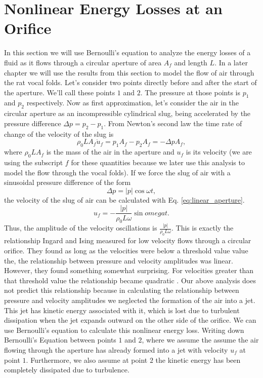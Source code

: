 \documentclass[12pt, letter]{report}
\begin{document}
\section{Nonlinear Energy Losses at an Orifice}
In this section we will use Bernoulli's equation to analyze the energy losses of a fluid as it flows through a circular aperture of area $A_f$ and length $L$. In a later chapter we will use the results from this section to model the flow of air through the rat vocal folds. Let's consider two points directly before and after the start of the aperture. We'll call these points $1$ and $2$. The pressure at those points is $p_1$ and $p_2$ respectively. Now as first approximation, let's consider the air in the circular aperture as an incompressible cylindrical slug, being accelerated by the pressure difference $\Delta p = p_2 - p_1$. From Newton's second law the time rate of change of the velocity of the slug is 
\begin{equation}  
\label{eq:linear_aperture}
\rho_0 L A_f \dot{u}_f = p_1 A_f - p_2 A_f = -\Delta p A_f,
\end{equation}
where $\rho_0 L A_f$ is the mass of the air in the aperture and $u_f$ is its velocity (we are using the subscript $f$ for these quantities because we later use this analysis to model the flow through the vocal folds). If we force the slug of air with a sinusoidal pressure difference of the form
\begin{equation}
\Delta p = |p| \cos{\omega t},
\end{equation}
the velocity of the slug of air can be calculated with Eq. \ref{eq:linear_aperture}.
\begin{equation}
u_f = -\frac{|p|}{\rho_0 L \omega} \sin{omega t}.  
\end{equation}
Thus, the amplitude of the velocity oscillations is $\frac{|p|}{\rho_0 L \omega}$. This is exactly the relationship Ingard and Ising measured for low velocity flows through a circular orifice. They found as long as the velocities were below a threshold value value the, the relationship between pressure and velocity amplitudes was linear. However, they found something somewhat surprising. For velocities greater than that threshold value the relationship became quadratic \cite{Ingard1967}. Our above analysis does not predict this relationship because in calculating the relationship between pressure and velocity amplitudes we neglected the formation of the air into a jet. This jet has kinetic energy associated with it, which is lost due to turbulent dissipation when the jet expands outward on the other side of the orifice. We can use Bernoulli's equation to calculate this nonlinear energy loss. Writing down Bernoulli's Equation between points $1$ and $2$, where we assume the assume the air flowing through the aperture has already formed into a jet with velocity $u_f$ at point $1$. Furthermore, we also assume at point $2$ the kinetic energy has been completely dissipated due to turbulence.
\end{document}
